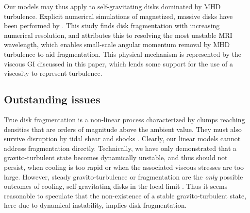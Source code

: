 
Our models may thus apply to self-gravitating disks dominated by MHD
turbulence.     
Explicit numerical simulations of magnetized, massive disks have been performed 
by \cite{fromang05}. This study finds disk fragmentation with increasing numerical
resolution, and attributes this to resolving the most unstable MRI
wavelength, which enables small-scale angular momentum removal by MHD
turbulence to aid fragmentation. %
This physical mechanism is represented by the viscous GI 
discussed in this paper, which lends some support for  
the use of a viscosity to represent turbulence.    


\subsection{Outstanding issues}
True disk fragmentation is a non-linear process characterized by
clumps reaching densities that are orders of magnitude above the
ambient value. They must also survive 
disruption by tidal shear and shocks \citep{shlosman87,young16}.  
Clearly, our linear models cannot address fragmentation
directly. Technically, we have only demonstrated that a 
gravito-turbulent state becomes dynamically unstable, and thus should
not persist, when cooling is too rapid or when the associated viscous
stresses are too large.  However, steady gravito-turbulence or 
fragmentation are the \emph{only} possible outcomes of cooling, 
self-gravitating disks in the local limit \citep[][]{gammie01}.    
Thus it seems reasonable to speculate that the non-existence of a stable
gravito-turbulent state, here due to dynamical instability, implies
disk fragmentation.

